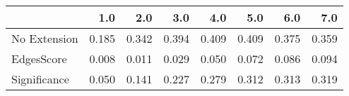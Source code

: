 \begin{tabular}{lrrrrrrr}
\toprule
{} &   1.0 &   2.0 &   3.0 &   4.0 &   5.0 &   6.0 &   7.0 \\
\midrule
No Extension & 0.185 & 0.342 & 0.394 & 0.409 & 0.409 & 0.375 & 0.359 \\
EdgesScore   & 0.008 & 0.011 & 0.029 & 0.050 & 0.072 & 0.086 & 0.094 \\
Significance & 0.050 & 0.141 & 0.227 & 0.279 & 0.312 & 0.313 & 0.319 \\
\bottomrule
\end{tabular}
